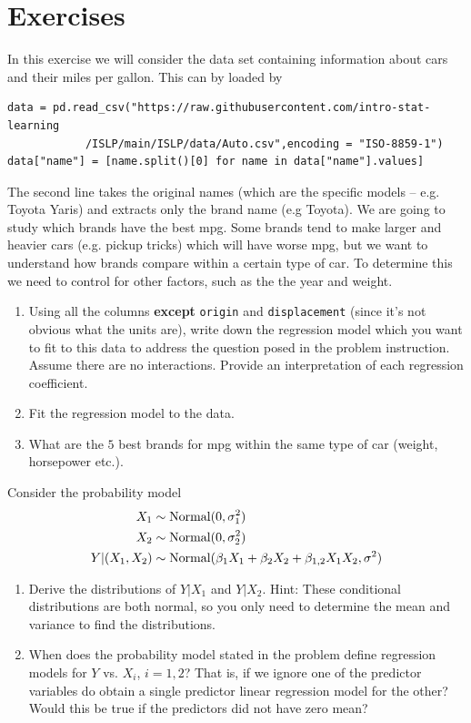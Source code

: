 \section{Exercises}
\begin{exercise}
In this exercise we will consider the data set containing information about cars and their miles per gallon. This can by loaded by 
\begin{Verbatim}
data = pd.read_csv("https://raw.githubusercontent.com/intro-stat-learning
			/ISLP/main/ISLP/data/Auto.csv",encoding = "ISO-8859-1")
data["name"] = [name.split()[0] for name in data["name"].values]
\end{Verbatim}
The second line takes the original names (which are the specific models -- e.g. Toyota Yaris) and extracts only the brand name (e.g  Toyota). We are going to study which brands have the best mpg. Some brands tend to make larger and heavier cars (e.g. pickup tricks) which will have worse mpg, but we want to understand how brands compare within a certain type of car. To determine this we need to control for other factors, such as the the year and weight. 
\begin{enumerate}[label=(\alph*)]
\item Using all the columns {\bf except} \verb!origin! and \verb!displacement! (since it's not obvious what the units are), write down the regression model which you want to fit to this data to address the question posed in the problem instruction. Assume there are no interactions. Provide an interpretation of each regression coefficient.  
\item Fit the regression model to the data. 
\item What are the $5$ best brands for mpg within the same type of car (weight, horsepower etc.). 
\end{enumerate}


\end{exercise}
\begin{exercise}
Consider the probability model 
\begin{align*}
X_1 &\sim {\rm Normal}(0,\sigma_1^2)\\
X_2 &\sim {\rm Normal}(0,\sigma_2^2)\\
Y|(X_1,X_2) &\sim {\rm Normal}(\beta_1 X_1 + \beta_2 X_2 + \beta_{1,2}X_1X_2,\sigma^2)
\end{align*}
\begin{enumerate}[label=(\alph*)]
\item Derive the distributions of $Y|X_1$ and $Y|X_2$. Hint: These conditional distributions are both normal, so you only need to determine the mean and variance to find the distributions. 
\item When does the probability model stated in the problem define regression models for $Y$ vs. $X_i$, $i=1,2$? That is, if we ignore one of the predictor variables do obtain a single predictor linear regression model for the other?Would this be true if the predictors did not have zero mean?
\end{enumerate}

\end{exercise}


